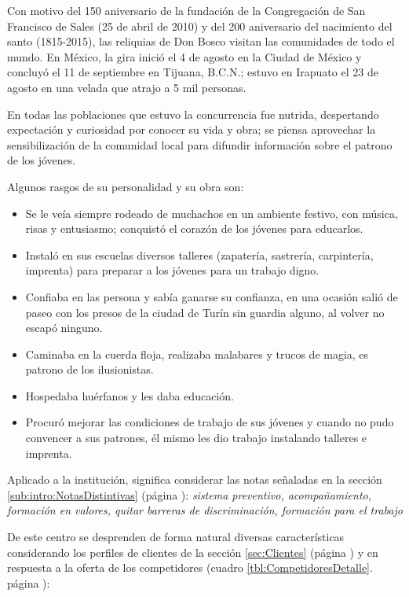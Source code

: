 Con motivo del 150 aniversario de la fundación de la Congregación de San Francisco de Sales (25 de abril de 2010) y del 200 aniversario del nacimiento del santo (1815-2015), las reliquias de Don Bosco visitan las comunidades de todo el mundo. En México, la gira inició el 4 de agosto en la Ciudad de México y concluyó el 11 de septiembre en Tijuana, B.C.N.; estuvo en Irapuato el 23 de agosto en una velada que atrajo a 5 mil personas.

En todas las poblaciones que estuvo la concurrencia fue nutrida, despertando expectación y curiosidad por conocer su vida y obra; se piensa aprovechar la sensibilización de la comunidad local para difundir información sobre el patrono de los jóvenes.

Algunos rasgos de su personalidad y su obra son:

\begin{itemize}
	\item Se le veía siempre rodeado de muchachos en un ambiente festivo, con música, risas y entusiasmo; conquistó el corazón de los jóvenes para educarlos.
	\item Instaló en sus escuelas diversos talleres (zapatería, sastrería, carpintería, imprenta) para preparar a los jóvenes para un trabajo digno.
	\item Confiaba en las persona y sabía ganarse su confianza, en una ocasión salió de paseo con los presos de la ciudad de Turín sin guardia alguno, al volver no escapó ninguno.
	\item Caminaba en la cuerda floja, realizaba malabares y trucos de magia, es patrono de los ilusionistas.
	\item Hospedaba huérfanos y les daba educación.
	\item Procuró mejorar las condiciones de trabajo de sus jóvenes y cuando no pudo convencer a sus patrones, él mismo les dio trabajo instalando talleres e imprenta.
\end{itemize}

Aplicado a la institución, significa considerar las notas señaladas en la sección \ref{sub:intro:NotasDistintivas} (página \pageref{sub:intro:NotasDistintivas}): \emph{sistema preventivo, acompañamiento, formación en valores, quitar barreras de discriminación, formación para el trabajo}

De este centro se desprenden de forma natural diversas características considerando los perfiles de clientes de la sección \ref{sec:Clientes} (página \pageref{sec:Clientes}) y en respuesta a la oferta de los competidores (cuadro \ref{tbl:CompetidoresDetalle}. p\'agina \pageref{tbl:CompetidoresDetalle}):

